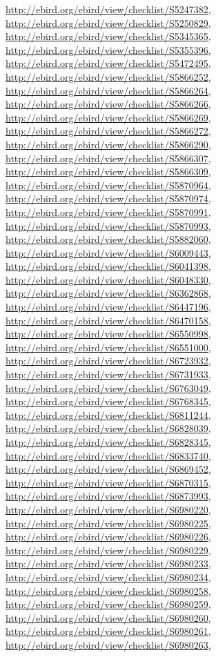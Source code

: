 \documentclass[9pt, article]{memoir}
\begin{document}
\begin{multicols}{2}
\url{http://ebird.org/ebird/view/checklist/S5247382}, 
\url{http://ebird.org/ebird/view/checklist/S5250829}, 
\url{http://ebird.org/ebird/view/checklist/S5345365}, 
\url{http://ebird.org/ebird/view/checklist/S5355396}, 
\url{http://ebird.org/ebird/view/checklist/S5472495}, 
\url{http://ebird.org/ebird/view/checklist/S5866252}, 
\url{http://ebird.org/ebird/view/checklist/S5866264}, 
\url{http://ebird.org/ebird/view/checklist/S5866266}, 
\url{http://ebird.org/ebird/view/checklist/S5866269}, 
\url{http://ebird.org/ebird/view/checklist/S5866272}, 
\url{http://ebird.org/ebird/view/checklist/S5866290}, 
\url{http://ebird.org/ebird/view/checklist/S5866307}, 
\url{http://ebird.org/ebird/view/checklist/S5866309}, 
\url{http://ebird.org/ebird/view/checklist/S5870964}, 
\url{http://ebird.org/ebird/view/checklist/S5870974}, 
\url{http://ebird.org/ebird/view/checklist/S5870991}, 
\url{http://ebird.org/ebird/view/checklist/S5870993}, 
\url{http://ebird.org/ebird/view/checklist/S5882060}, 
\url{http://ebird.org/ebird/view/checklist/S6009443}, 
\url{http://ebird.org/ebird/view/checklist/S6041398}, 
\url{http://ebird.org/ebird/view/checklist/S6048330}, 
\url{http://ebird.org/ebird/view/checklist/S6362868}, 
\url{http://ebird.org/ebird/view/checklist/S6447196}, 
\url{http://ebird.org/ebird/view/checklist/S6470158}, 
\url{http://ebird.org/ebird/view/checklist/S6550998}, 
\url{http://ebird.org/ebird/view/checklist/S6551000}, 
\url{http://ebird.org/ebird/view/checklist/S6723932}, 
\url{http://ebird.org/ebird/view/checklist/S6731933}, 
\url{http://ebird.org/ebird/view/checklist/S6763049}, 
\url{http://ebird.org/ebird/view/checklist/S6768345}, 
\url{http://ebird.org/ebird/view/checklist/S6811244}, 
\url{http://ebird.org/ebird/view/checklist/S6828039}, 
\url{http://ebird.org/ebird/view/checklist/S6828345}, 
\url{http://ebird.org/ebird/view/checklist/S6833740}, 
\url{http://ebird.org/ebird/view/checklist/S6869452}, 
\url{http://ebird.org/ebird/view/checklist/S6870315}, 
\url{http://ebird.org/ebird/view/checklist/S6873993}, 
\url{http://ebird.org/ebird/view/checklist/S6980220}, 
\url{http://ebird.org/ebird/view/checklist/S6980225}, 
\url{http://ebird.org/ebird/view/checklist/S6980226}, 
\url{http://ebird.org/ebird/view/checklist/S6980229}, 
\url{http://ebird.org/ebird/view/checklist/S6980233}, 
\url{http://ebird.org/ebird/view/checklist/S6980234}, 
\url{http://ebird.org/ebird/view/checklist/S6980258}, 
\url{http://ebird.org/ebird/view/checklist/S6980259}, 
\url{http://ebird.org/ebird/view/checklist/S6980260}, 
\url{http://ebird.org/ebird/view/checklist/S6980261}, 
\url{http://ebird.org/ebird/view/checklist/S6980263}, 

\end{multicols}
\end{document}
